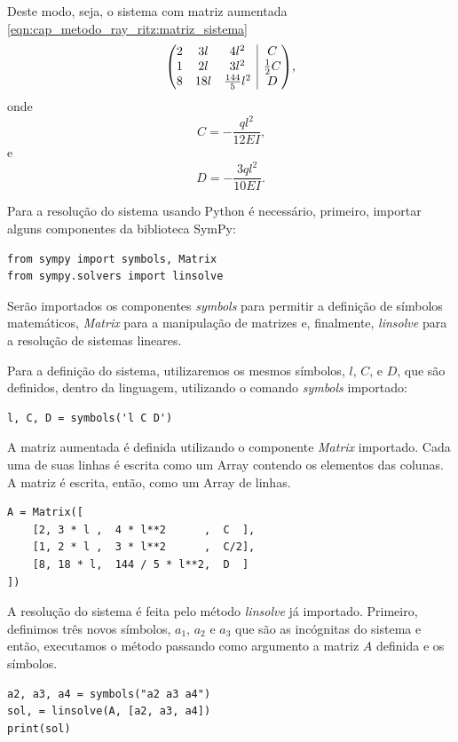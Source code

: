 \documentclass[
	12pt,				%
	openright,			%
    twoside,			%
	a4paper,			%
	english,			%
	french,				%
	spanish,			%
	brazil				%
	]{abntex2}
\makeatletter
\newenvironment{amatrix}[1]{%
  \left(\begin{array}{@{}*{#1}{c}|c@{}}
}{%
  \end{array}\right)
}
\numberwithin{lema}{chapter}
\numberwithin{teorema}{chapter}
\numberwithin{definicao}{chapter}
\numberwithin{exemplo}{chapter}
\numberwithin{figure}{chapter}
\makeatother
\begin{document}
\begin{apendicesenv}
{	Deste modo, seja, o sistema com matriz aumentada \eqref{eqn:cap_metodo_ray_ritz:matriz_sistema}
	\begin{equation}
		\label{eqn:cap_ap_sis_lin:matriz_sistema}
		\begin{amatrix}{3}
			2 & 3l  & 4l^2 				 & C \\
			1 & 2l  & 3l^2				 & \frac{1}{2}C \\
			8 & 18l & \frac{144}{5} l^2 & D
		\end{amatrix}
		\text{,}
	\end{equation}
	onde 
	\begin{equation}
		\label{eqn:cap_ap_sis_lin:aux_var_C}
		C=-\frac{ql^2}{12EI}
		\text{,}
	\end{equation}
	e
	\begin{equation}
		\label{eqn:cap_ap_sis_lin:aux_var_D}
		D=-\frac{3ql^2}{10EI}
		\text{.}
	\end{equation}
	
	Para a resolução do sistema usando Python é necessário, primeiro, importar alguns componentes da biblioteca SymPy:
	\begin{lstlisting}[style=Python]
from sympy import symbols, Matrix
from sympy.solvers import linsolve
	\end{lstlisting}
	
	Serão importados os componentes \textit{symbols} para permitir a definição de símbolos matemáticos, \textit{Matrix} para a manipulação de matrizes e, finalmente, \textit{linsolve} para a resolução de sistemas lineares.
	
	Para a definição do sistema, utilizaremos os mesmos símbolos, $l$, $C$, e $D$, que são definidos, dentro da linguagem, utilizando o comando \textit{symbols} importado:
	\begin{lstlisting}[style=Python]
l, C, D = symbols('l C D')
	\end{lstlisting}
	
	A matriz aumentada é definida utilizando o componente \textit{Matrix} importado. Cada uma de suas linhas é escrita como um Array contendo os elementos das colunas. A matriz é escrita, então, como um Array de linhas.
	\begin{lstlisting}[style=Python]
A = Matrix([
    [2, 3 * l ,  4 * l**2      ,  C  ],
    [1, 2 * l ,  3 * l**2      ,  C/2],
    [8, 18 * l,  144 / 5 * l**2,  D  ]
])
	\end{lstlisting}
	
	A resolução do sistema é feita pelo método \textit{linsolve} já importado. Primeiro, definimos três novos símbolos, $a_1$, $a_2$ e $a_3$ que são as incógnitas do sistema e então, executamos o método passando como argumento a matriz $A$ definida e os símbolos.
	\begin{lstlisting}[style=Python]
a2, a3, a4 = symbols("a2 a3 a4")
sol, = linsolve(A, [a2, a3, a4])
print(sol)
	\end{lstlisting}

}
\end{apendicesenv}
\end{document}
